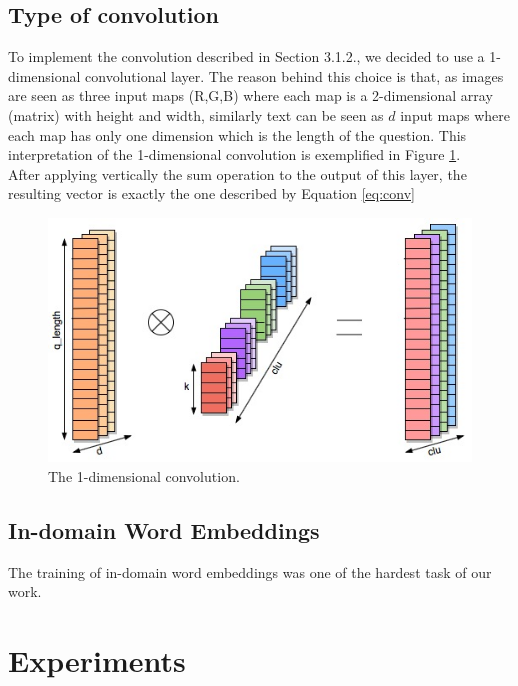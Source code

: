 \documentclass[10pt,twocolumn,letterpaper]{article}
\begin{document}
\subsection{Type of convolution}

To implement the convolution described in Section 3.1.2., we decided to use a 1-dimensional convolutional layer. The reason behind this choice is that, as images are seen as three input maps (R,G,B) where each map is a 2-dimensional array (matrix) with height and width, similarly text can be seen as $d$ input maps where each map has only one dimension which is the length of the question. This interpretation of the 1-dimensional convolution is exemplified in Figure \ref{fig:conv}.\\
After applying vertically the sum operation to the output of this layer, the resulting vector is exactly the one described by Equation \ref{eq:conv}    

\begin{figure}[t]
\begin{center}
\includegraphics[width=0.8\linewidth]{img/conv1d.jpg}
\end{center}
\caption{The 1-dimensional convolution.}
\label{fig:conv}
\end{figure}
\subsection{In-domain Word Embeddings}    
The training of in-domain word embeddings was one of the hardest task of our work. 
\section{Experiments}
\end{document}
